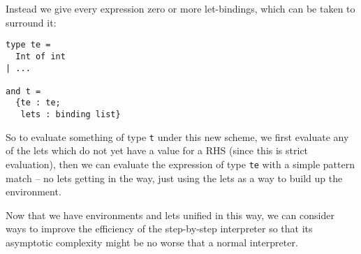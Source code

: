 \documentclass[10pt]{article}
\begin{document}
\noindent Instead we give every expression zero or more let-bindings, which can be taken to surround it:

\begin{verbatim}
type te =
  Int of int
| ...

and t =
  {te : te;
   lets : binding list}
\end{verbatim}

So to evaluate something of type \texttt{t} under this new scheme, we first evaluate any of the lets which do not yet have a value for a RHS (since this is strict evaluation), then we can evaluate the expression of type \texttt{te} with a simple pattern match -- no lets getting in the way, just using the lets as a way to build up the environment.

Now that we have environments and lets unified in this way, we can consider ways to improve the efficiency of the step-by-step interpreter so that its asymptotic complexity might be no worse that a normal interpreter.
\end{document}
